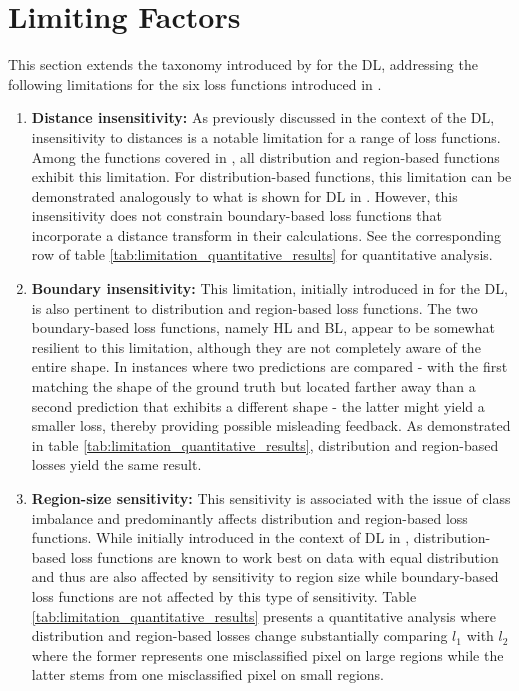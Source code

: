 \section{Limiting Factors}
\label{sec:limiting_factors}
This section extends the taxonomy introduced by \cite{9338261} for the \ac{DL}, addressing the following limitations for the six loss functions introduced in .
\begin{enumerate}
  \item \textbf{Distance insensitivity:} As previously discussed in the context of the \acf{DL}, insensitivity to distances is a notable limitation for a range of loss functions. Among the functions covered in , all distribution and region-based functions exhibit this limitation. For distribution-based functions, this limitation can be demonstrated analogously to what is shown for \ac{DL} in . However, this insensitivity does not constrain boundary-based loss functions that incorporate a distance transform in their calculations. See the corresponding row of table \ref{tab:limitation_quantitative_results} for quantitative analysis.
  \item \textbf{Boundary insensitivity:} This limitation, initially introduced in  for the \ac{DL}, is also pertinent to distribution and region-based loss functions. The two boundary-based loss functions, namely \ac{HL} and \ac{BL}, appear to be somewhat resilient to this limitation, although they are not completely aware of the entire shape. In instances where two predictions are compared - with the first matching the shape of the ground truth but located farther away than a second prediction that exhibits a different shape - the latter might yield a smaller loss, thereby providing possible misleading feedback. As demonstrated in table \ref{tab:limitation_quantitative_results}, distribution and region-based losses yield the same result.
  \item \textbf{Region-size sensitivity:} This sensitivity is associated with the issue of class imbalance and predominantly affects distribution and region-based loss functions. While initially introduced in the context of \ac{DL} in , distribution-based loss functions are known to work best on data with equal distribution and thus are also affected by sensitivity to region size \cite{Jadon_2020} \cite{YEUNG2022102026} while boundary-based loss functions are not affected by this type of sensitivity. Table \ref{tab:limitation_quantitative_results} presents a quantitative analysis where distribution and region-based losses change substantially comparing $l_1$ with $l_2$ where the former represents one misclassified pixel on large regions while the latter stems from one misclassified pixel on small regions.

\end{enumerate}
